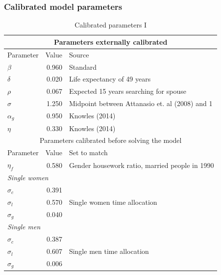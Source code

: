 \documentclass{beamer}
\begin{document}
\begin{frame}
	\frametitle{Calibrated model parameters}
	\tiny
	\begin{table}[htbp]
		\centering
		\caption{Calibrated parameters I}
		\begin{tabular}{lll}
			\toprule
			\multicolumn{3}{c}{Parameters externally calibrated} \\
			\midrule
			Parameter & Value & Source \\
			\midrule
			$\beta$ & \multicolumn{1}{r}{0.960} & Standard \\
			$\delta$ & \multicolumn{1}{r}{0.020} & Life expectancy of 49 years \\
			$\rho$ & \multicolumn{1}{r}{0.067} & Expected 15 years searching for spouse \\
			$\sigma$ & \multicolumn{1}{r}{1.250} & Midpoint between Attanasio et. al (2008) and 1 \\
			$\alpha_g$ & \multicolumn{1}{r}{0.950} & Knowles (2014) \\
			$\eta$ & \multicolumn{1}{r}{0.330} & Knowles (2014) \\
			\midrule
			\multicolumn{3}{c}{Parameters calibrated before solving the model} \\
			\midrule
			Parameter & Value & Set to match \\
			\midrule
			$\eta_f$ & \multicolumn{1}{r}{0.580} & Gender housework ratio, married people in 1990 \\
			\multicolumn{2}{l}{\textit{Single women}} &  \\
			$\sigma_c$ & \multicolumn{1}{r}{0.391} &  \\
			$\sigma_l$ & \multicolumn{1}{r}{0.570} & Single women time allocation \\
			$\sigma_g$ & \multicolumn{1}{r}{0.040} &  \\
			\multicolumn{2}{l}{\textit{Single men}} &  \\
			$\sigma_c$ & \multicolumn{1}{r}{0.387} &  \\
			$\sigma_l$ & \multicolumn{1}{r}{0.607} & Single men time allocation \\
			$\sigma_g$ & \multicolumn{1}{r}{0.006} &  \\
			\bottomrule
			\bottomrule
		\end{tabular}
	\end{table}
\end{frame}
\end{document}
